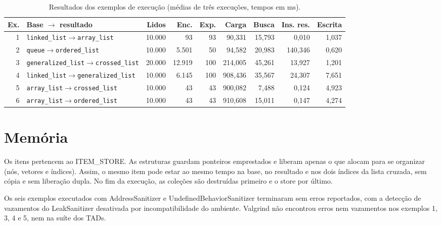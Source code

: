 \documentclass[11pt,a4paper]{article}
\newcommand{\cab}[1]{\rowcolor{gray!22}#1}
\begin{document}
\begin{table}[!htbp]
\centering
\caption{Resultados dos exemplos de execução (médias de três execuções, tempos em ms).}
\footnotesize
\setlength{\tabcolsep}{4pt}
\begin{tabular}{@{}r p{4.3cm} r r r r r r r@{}}
\toprule
\cab{\textbf{Ex.} & \textbf{Base $\rightarrow$ resultado} & \textbf{Lidos} & \textbf{Enc.} & \textbf{Exp.} & \textbf{Carga} & \textbf{Busca} & \textbf{Ins. res.} & \textbf{Escrita}} \\
\midrule
1 & \texttt{linked\_\allowbreak{}list}$\rightarrow$\texttt{array\_\allowbreak{}list} & 10.000 & 93 & 93 & 90,331 & 15,793 & 0,010 & 1,037 \\
2 & \texttt{queue}$\rightarrow$\texttt{ordered\_\allowbreak{}list} & 10.000 & 5.501 & 50 & 94,582 & 20,983 & 140,346 & 0,620 \\
3 & \texttt{generalized\_\allowbreak{}list}$\rightarrow$\texttt{crossed\_\allowbreak{}list} & 20.000 & 12.919 & 100 & 214,005 & 45,261 & 13,927 & 1,201 \\
4 & \texttt{linked\_\allowbreak{}list}$\rightarrow$\texttt{generalized\_\allowbreak{}list} & 10.000 & 6.145 & 100 & 908,436 & 35,567 & 24,307 & 7,651 \\
5 & \texttt{array\_\allowbreak{}list}$\rightarrow$\texttt{crossed\_\allowbreak{}list} & 10.000 & 43 & 43 & 900,082 & 7,488 & 0,124 & 4,923 \\
6 & \texttt{array\_\allowbreak{}list}$\rightarrow$\texttt{ordered\_\allowbreak{}list} & 10.000 & 43 & 43 & 910,608 & 15,011 & 0,147 & 4,274 \\
\bottomrule
\end{tabular}
\end{table}

\section{Memória}

Os itens pertencem ao ITEM\_STORE. As estruturas guardam ponteiros emprestados e liberam apenas o que alocam para se organizar (nós, vetores e índices). Assim, o mesmo item pode estar ao mesmo tempo na base, no resultado e nos dois índices da lista cruzada, sem cópia e sem liberação dupla. No fim da execução, as coleções são destruídas primeiro e o store por último.

Os seis exemplos executados com AddressSanitizer e UndefinedBehaviorSanitizer terminaram sem erros reportados, com a detecção de vazamentos do LeakSanitizer desativada por incompatibilidade do ambiente. Valgrind não encontrou erros nem vazamentos nos exemplos 1, 3, 4 e 5, nem na suíte dos TADs.
\end{document}
